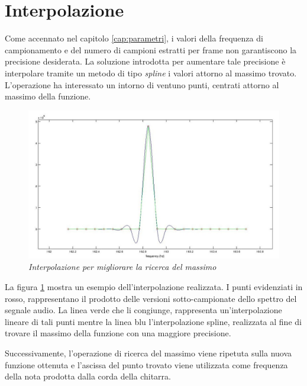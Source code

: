 \section{Interpolazione}\label{cap:interpolazione}

Come accennato nel capitolo \ref{cap:parametri}, i valori della frequenza di campionamento e del numero di campioni estratti per frame non garantiscono la precisione desiderata.
La soluzione introdotta per aumentare tale precisione è interpolare tramite un metodo di tipo \emph{spline} i valori attorno al massimo trovato.
L'operazione ha interessato un intorno di ventuno punti, centrati attorno al massimo della funzione.

	\begin{figure}[h]
	  \begin{center} 
	    \includegraphics[width=\textwidth*\real{0.9}]{images/ch_05/interpolazione.jpg}
	  \end{center} 
	  \caption{\textit{Interpolazione per migliorare la ricerca del massimo}}  
	  \label{fig:interpolazione}
	\end{figure}

La figura \ref{fig:interpolazione} mostra un esempio dell'interpolazione realizzata. 
I punti evidenziati in rosso, rappresentano il prodotto delle versioni sotto-campionate dello spettro del segnale audio.
La linea verde che li congiunge, rappresenta un'interpolazione lineare di tali punti mentre la linea blu l'interpolazione spline, realizzata al fine di trovare il massimo della funzione con una maggiore precisione.

Successivamente, l'operazione di ricerca del massimo viene ripetuta sulla nuova funzione ottenuta e l'ascissa del punto trovato viene utilizzata come frequenza della nota prodotta dalla corda della chitarra.


